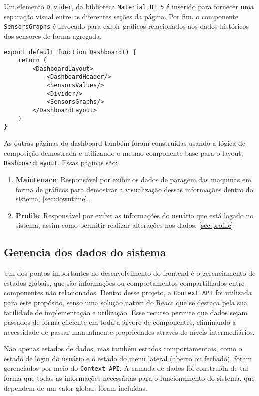 Um elemento \texttt{Divider}, da biblioteca \texttt{Material UI 5} \cite{muiDocs} é inserido para fornecer uma separação visual entre as diferentes seções da página. Por fim, o componente \texttt{SensorsGraphs} é invocado para exibir gráficos relacionados aos dados históricos dos sensores de forma agregada.

\begin{verbatim}
export default function Dashboard() {
    return (
        <DashboardLayout>
            <DashboardHeader/>
            <SensorsValues/>
            <Divider/>
            <SensorsGraphs/>
        </DashboardLayout>
    )
}
\end{verbatim}

As outras páginas do dashboard também foram construídas usando a lógica de composição demostrada e utilizando o mesmo componente base para o layout, \texttt{DashboardLayout}. Essas páginas são:
\begin{enumerate}
    \item \textbf{Maintenace}: Responsável por exibir os dados de paragem das maquinas em forma de gráficos para demostrar a visualização dessas informações dentro do sistema, \ref{sec:downtime}.
    \item \textbf{Profile}: Responsável por exibir as informações do usuário que está logado no sistema, assim como permitir realizar alterações nos dados, \ref{sec:profile}.
\end{enumerate}


\subsection{Gerencia dos dados do sistema}\label{subsec:contextApi}
Um dos pontos importantes no desenvolvimento do frontend é o gerenciamento de estados globais, que são informações ou comportamentos compartilhados entre componentes não relacionados. Dentro desse projeto, a \texttt{Context API} \cite{reactCreateContext} foi utilizada para este propósito, senso uma solução nativa do React que se destaca pela sua facilidade de implementação e utilização. Esse recurso permite que dados sejam passados de forma eficiente em toda a árvore de componentes, eliminando a necessidade de passar manualmente propriedades através de níveis intermediários.

Não apenas estados de dados, mas também estados comportamentais, como o estado de login do usuário e o estado do menu lateral (aberto ou fechado), foram gerenciados por meio do \texttt{Context API}. A camada de dados foi construída de tal forma que todas as informações necessárias para o funcionamento do sistema, que dependem de um valor global, foram incluídas.

